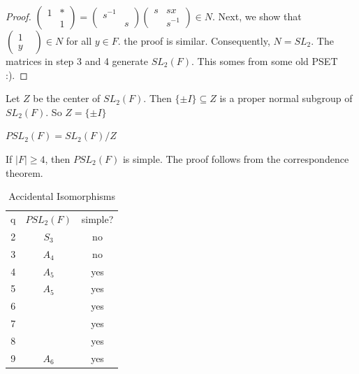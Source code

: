 \documentclass{article}
\begin{document}
\begin{proof}
$\begin{pmatrix}
1&*\\&1
\end{pmatrix}=\begin{pmatrix}
s^{-1}&\\&s
\end{pmatrix}
\begin{pmatrix}
s&sx\\&s^{-1}
\end{pmatrix}\in N$. Next, we show that $\begin{pmatrix}
1&\\y&
\end{pmatrix}\in N$ for all $y\in F$. the proof is similar. Consequently, $N=SL_2$. The matrices in step 3 and 4 generate $SL_2(F)$. This somes from some old PSET :).
\end{proof}
Let $Z$ be the center of $SL_2(F)$. Then $\{\pm I\}\subseteq Z$ is a proper normal subgroup of $SL_2(F)$. So $Z=\{\pm I\}$
\begin{definition}
$PSL_2(F)=SL_2(F)/Z$
\end{definition}
\begin{corollary}
If $|F|\geq 4$, then $PSL_2(F)$ is simple. The proof follows from the correspondence theorem.
\end{corollary}
\begin{table}[h]
    \centering
    \begin{tabular}{c|c|c}
        q & $PSL_2(F)$ & simple? \\
        2 & $S_3$ & no \\
        3 & $A_4$ & no \\
        4 & $A_5$ & yes \\
        5 & $A_5$ & yes \\
        6 & & yes \\
        7 & & yes \\
        8 & & yes \\
        9 & $A_6$ & yes
    \end{tabular}
    \caption{Accidental Isomorphisms}
    \label{tab:my_label}
\end{table}
\end{document}
